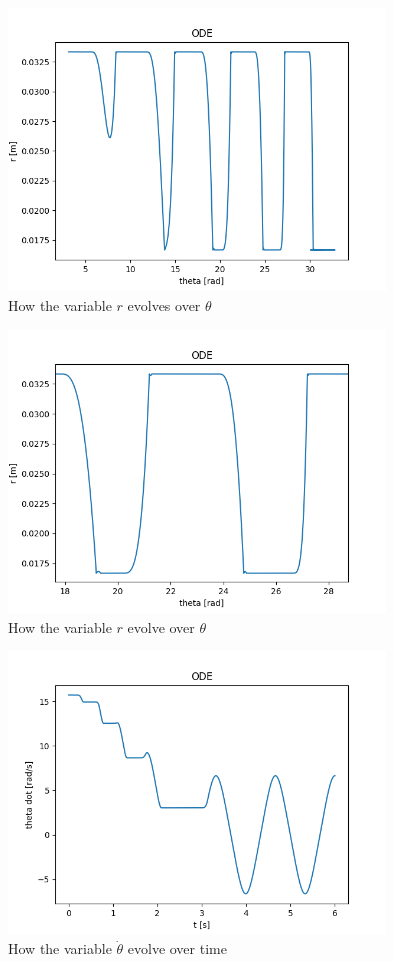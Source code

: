 \begin{figure}[ht]
	\centering
	\includegraphics[width=10cm]{img/simulation/r_theta_t.png}
	\caption{How the variable $r$ evolves over $\theta$}
	\label{fig:r theta}
\end{figure}

\begin{figure}[ht]
	\centering
	\includegraphics[width=10cm]{img/simulation/r_theta_t_zoom.png}
	\caption{How the variable $r$ evolve over $\theta$}
	\label{fig:r theta zoom}
\end{figure}

\begin{figure}[ht]
	\centering
	\includegraphics[width=10cm]{img/simulation/d_theta_t.png}
	\caption{How the variable $\dot{\theta}$ evolve over time}
	\label{fig:d theta t diagram}
\end{figure}